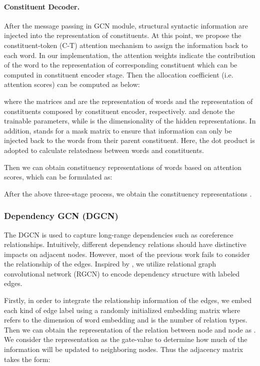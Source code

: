 \documentclass{article}
\begin{document}
\paragraph{Constituent Decoder.}
After the message passing in GCN module, structural syntactic information are injected into the representation of constituents. At this point, we propose the constituent-token (C-T) attention mechanism to assign the information back to each word. In our implementation, the attention weights indicate the contribution of the word to the representation of corresponding constituent which can be computed in constituent encoder stage. Then the allocation coefficient (i.e. attention scores) can be computed as below:

where the matrices  and  are the representation of words and the representation of constituents composed by constituent encoder, respectively.  and  denote the trainable parameters, while  is the dimensionality of the hidden representations. In addition,  stands for a mask matrix to ensure that information can only be injected back to the words from their parent constituent. Here, the dot product is adopted to calculate relatedness between words and constituents.

Then we can obtain constituency representations of words based on attention scores, which can be formulated as:


After the above three-stage process, we obtain the constituency representations .

\subsubsection{Dependency GCN (DGCN)}

The DGCN is used to capture long-range dependencies such as coreference relationships. Intuitively, different dependency relations should have distinctive impacts on adjacent nodes. However, most of the previous work fails to consider the relationship of the edges. Inspired by \cite{schlichtkrull2018modeling}, we utilize relational graph convolutional network (RGCN) to encode dependency structure with labeled edges.

Firstly, in order to integrate the relationship information of the edges, we  embed each kind of edge label using a randomly initialized embedding matrix  where  refers to the dimension of word embedding and  is the number of relation types. Then we can obtain the representation of the relation between node  and node  as . We consider the representation  as the gate-value to determine how much of the information will be updated to neighboring nodes. Thus the adjacency matrix  takes the form:
\end{document}
